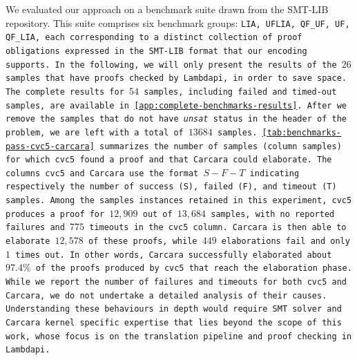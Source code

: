 \begin{table}[t]
\centering
\caption{
  Summary of benchmark.\\
  The format $S-F-T$ indicates respectively the number of success (S), failed (F) and timeout (T) samples.
}
{%
\scriptsize
{}%
}
\label{tab:benchmarks-pass-cvc5-carcara}
\end{table}

We evaluated our approach on a benchmark suite drawn from the SMT-LIB repository.
This suite comprises six benchmark groups: \tt{LIA}, \tt{UFLIA}, \tt{QF\_UF}, \tt{UF}, \tt{QF\_LIA}, each corresponding to a distinct collection of proof obligations expressed in the SMT-LIB format that our encoding supports.
In the following, we will only present the results of the $26$ samples that have proofs checked by Lambdapi, in order to save space.
The complete results for $54$ samples, including failed and timed-out samples, are available in \cref{app:complete-benchmarks-results}.
After we remove the samples that do not have \emph{unsat} status in the header of the problem, we are left with a total of $13684$ samples.
\cref{tab:benchmarks-pass-cvc5-carcara} summarizes the number of samples (column samples) for which cvc5 found a proof and that Carcara could elaborate.
The columns \tt{cvc5} and \tt{Carcara} use the format $S - F - T$ indicating respectively the number of success (S), failed (F), and timeout (T) samples.
Among the samples instances retained in this experiment, \texttt{cvc5} produces a proof for $12,909$ out of $13,684$ samples,
with no reported failures and $775$ timeouts in the \texttt{cvc5} column.
Carcara is then able to elaborate $12,578$ of these proofs, while $449$ elaborations fail and only $1$ times out.
In other words, Carcara successfully elaborated about $97.4\%$ of the proofs produced by \texttt{cvc5} that reach the elaboration phase.
While we report the number of failures and timeouts for both \texttt{cvc5} and Carcara, we do not undertake a detailed analysis of their causes.
Understanding these behaviours in depth would require SMT solver and Carcara kernel specific expertise that lies beyond the scope of this work, whose focus is on the translation pipeline and proof checking in Lambdapi.

